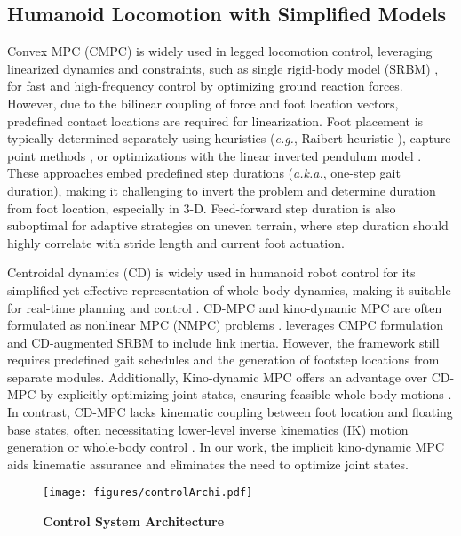 \subsection{Humanoid Locomotion with Simplified Models}
Convex MPC (CMPC) is widely used in legged locomotion control, leveraging linearized dynamics and constraints, such as single rigid-body model (SRBM) \cite{di2018dynamic}, for fast and high-frequency control by optimizing ground reaction forces. However, due to the bilinear coupling of force and foot location vectors, predefined contact locations are required \cite{di2018dynamic, ding2022orientation} for linearization. Foot placement is typically determined separately using heuristics (\textit{e.g.}, Raibert heuristic \cite{raibert1986legged}), capture point methods \cite{pratt2006capture}, or optimizations with the linear inverted pendulum model \cite{gu2024walking}. These approaches embed predefined step durations (\textit{a.k.a.}, one-step gait duration), making it challenging to invert the problem and determine duration from foot location, especially in 3-D. Feed-forward step duration is also suboptimal for adaptive strategies on uneven terrain, where step duration should highly correlate with stride length and current foot actuation.

Centroidal dynamics (CD) is widely used in humanoid robot control for its simplified yet effective representation of whole-body dynamics, making it suitable for real-time planning and control \cite{orin2013centroidal}. CD-MPC and kino-dynamic MPC are often formulated as nonlinear MPC (NMPC) problems \cite{romualdi2022online, dai2014whole, elobaid2023online}. \citet{garcia2021mpc} leverages CMPC formulation and CD-augmented SRBM to include link inertia.  However, the framework still requires predefined gait schedules and the generation of footstep locations from separate modules. Additionally, Kino-dynamic MPC offers an advantage over CD-MPC by explicitly optimizing joint states, ensuring feasible whole-body motions \cite{dantec2024centroidal}. In contrast, CD-MPC lacks kinematic coupling between foot location and floating base states, often necessitating lower-level inverse kinematics (IK) motion generation \cite{meduri2023biconmp} or whole-body control \cite{wensing2016improved}.
In our work, the implicit kino-dynamic MPC aids kinematic assurance and eliminates the need to optimize joint states. 


\begin{figure*}[!t]
\vspace{0.2cm}
		\center
		\texttt{[image: figures/controlArchi.pdf]}
		\caption{{\bfseries Control System Architecture}}
		\label{fig:controlArchi}
		\vspace{-0.2cm}
\end{figure*}

